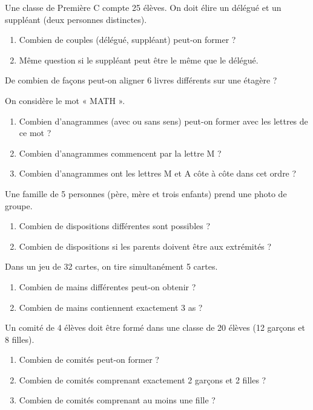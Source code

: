 \exo{}
Une classe de Première C compte 25 élèves. On doit élire un délégué et un suppléant (deux personnes distinctes).
\begin{enumerate}[label=\alph*)]
    \item Combien de couples (délégué, suppléant) peut-on former ?
    \item Même question si le suppléant peut être le même que le délégué.
\end{enumerate}


\exo{}
De combien de façons peut-on aligner 6 livres différents sur une étagère ?

\exo{}
On considère le mot « MATH ».
\begin{enumerate}[label=\alph*)]
    \item Combien d'anagrammes (avec ou sans sens) peut-on former avec les lettres de ce mot ?
    \item Combien d'anagrammes commencent par la lettre M ?
    \item Combien d'anagrammes ont les lettres M et A côte à côte dans cet ordre ?
\end{enumerate}

\exo{}
Une famille de 5 personnes (père, mère et trois enfants) prend une photo de groupe. 
\begin{enumerate}[label=\alph*)]
    \item Combien de dispositions différentes sont possibles ?
    \item Combien de dispositions si les parents doivent être aux extrémités ?
\end{enumerate}


\exo{}
Dans un jeu de 32 cartes, on tire simultanément 5 cartes.
\begin{enumerate}[label=\alph*)]
    \item Combien de mains différentes peut-on obtenir ?
    \item Combien de mains contiennent exactement 3 as ?
\end{enumerate}

\exo{}
Un comité de 4 élèves doit être formé dans une classe de 20 élèves (12 garçons et 8 filles).
\begin{enumerate}[label=\alph*)]
    \item Combien de comités peut-on former ?
    \item Combien de comités comprenant exactement 2 garçons et 2 filles ?
    \item Combien de comités comprenant au moins une fille ?
\end{enumerate}

